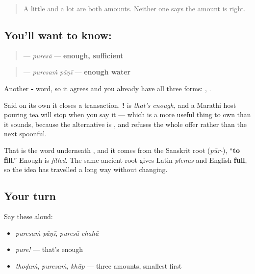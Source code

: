 \label{lesson:MR-C54-puresa}



\begin{quote}
A little and a lot are both amounts. Neither one says the amount is right.
\end{quote}

\subsection*{You'll want to know: }
\begin{quote}
\textbf{} — \emph{puresā} — \textbf{enough, sufficient}
\end{quote}

\begin{quote}
\textbf{ } — \emph{puresaṁ pāṇī} — \textbf{enough water}
\end{quote}

Another \textbf{-} word, so it agrees and you already have all three forms: \textbf{ }, \textbf{ }.

Said on its own it closes a transaction. \textbf{!} is \emph{that's enough}, and a Marathi host pouring tea will stop when you say it — which is a more useful thing to own than it sounds, because the alternative is \textbf{}, and \textbf{} refuses the whole offer rather than the next spoonful.

That \textbf{} is the word underneath \textbf{}, and it comes from the Sanskrit root \textbf{} (\emph{pūr-}), \textquotedblleft{}\textbf{to fill}.\textquotedblright{} Enough is \emph{filled}. The same ancient root gives Latin \emph{plenus} and English \textbf{full}, so the idea has travelled a long way without changing.

\subsection*{Your turn}
Say these aloud:

\begin{itemize}
\raggedright
  \item \emph{puresaṁ pāṇī}, \emph{puresā chahā}
  \item \emph{pure!} — that's enough
  \item \emph{thoḍaṁ}, \emph{puresaṁ}, \emph{khūp} — three amounts, smallest first
\end{itemize}

